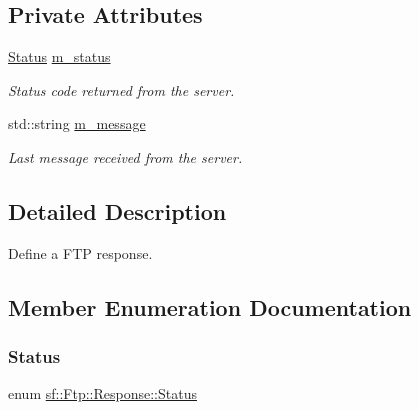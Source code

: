 \subsection*{Private Attributes}
\begin{DoxyCompactItemize}
\item 
\mbox{\label{classsf_1_1_ftp_1_1_response_af3a8918ddd408ff8fbcce5c0beda11d4}} 
\mbox{\hyperlink{classsf_1_1_ftp_1_1_response_af81738f06b6f571761696291276acb3b}{Status}} \mbox{\hyperlink{classsf_1_1_ftp_1_1_response_af3a8918ddd408ff8fbcce5c0beda11d4}{m\+\_\+status}}
\begin{DoxyCompactList}\small\item\em Status code returned from the server. \end{DoxyCompactList}\item 
\mbox{\label{classsf_1_1_ftp_1_1_response_aaf692d0df6066d4a1f4d0677869b8f7b}} 
std\+::string \mbox{\hyperlink{classsf_1_1_ftp_1_1_response_aaf692d0df6066d4a1f4d0677869b8f7b}{m\+\_\+message}}
\begin{DoxyCompactList}\small\item\em Last message received from the server. \end{DoxyCompactList}\end{DoxyCompactItemize}


\subsection{Detailed Description}
Define a F\+TP response. 

\begin{DoxyVerb}\end{DoxyVerb}
 

\subsection{Member Enumeration Documentation}
\mbox{\label{classsf_1_1_ftp_1_1_response_af81738f06b6f571761696291276acb3b}} 
\subsubsection{\texorpdfstring{Status}{Status}}
{\footnotesize\ttfamily enum \mbox{\hyperlink{classsf_1_1_ftp_1_1_response_af81738f06b6f571761696291276acb3b}{sf\+::\+Ftp\+::\+Response\+::\+Status}}}




